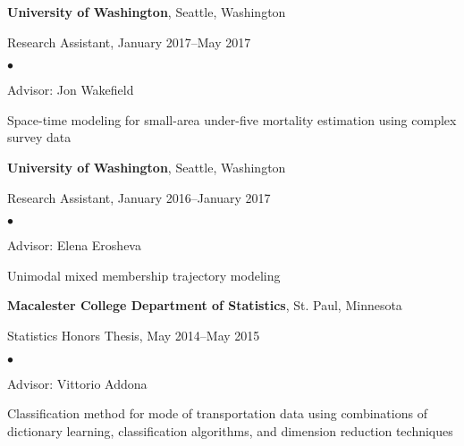 \documentclass[margin,centered]{res}
\newenvironment{list1}{
  \begin{list}{\ding{113}}{%
      \setlength{\itemsep}{0in}
      \setlength{\parsep}{0in} \setlength{\parskip}{0in}
      \setlength{\topsep}{0in} \setlength{\partopsep}{0in}
      \setlength{\leftmargin}{0.17in}}}{\end{list}}
\newenvironment{list2}{
  \begin{list}{$\bullet$}{%
      \setlength{\itemsep}{0in}
      \setlength{\parsep}{0in} \setlength{\parskip}{0in}
      \setlength{\topsep}{0in} \setlength{\partopsep}{0in}
      \setlength{\leftmargin}{0.2in}}}{\end{list}}
\begin{document}
\begin{resume}
{\bf University of Washington},  Seattle, Washington
\begin{list1}
\item[] 
Research Assistant, January 2017--May 2017
\begin{list2}
\vspace*{.05in}
\item Advisor: Jon Wakefield
\item Space-time modeling for  small-area under-five mortality estimation using complex survey data
\end{list2} 
\end{list1}

{\bf University of Washington},  Seattle, Washington
\begin{list1}
\item[] 
Research Assistant, January 2016--January 2017
\begin{list2}
\vspace*{.05in}
\item Advisor: Elena Erosheva
\item Unimodal mixed membership trajectory modeling
\end{list2} 
\end{list1}




{\bf Macalester College Department of Statistics}, St. Paul, Minnesota
\begin{list1}
\item[] 
Statistics Honors Thesis, May 2014--May 2015
\begin{list2}
\vspace*{.05in}
\item
Advisor: Vittorio Addona
\item Classification method for mode of transportation data using combinations of dictionary learning, classification algorithms, and dimension reduction techniques
\end{list2} 
\end{list1}



\end{resume}
\end{document}
